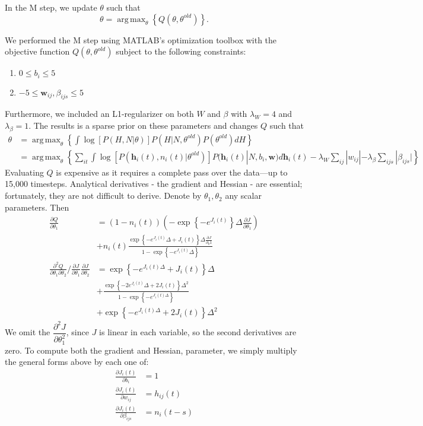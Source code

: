 \documentclass{article}
\DeclareMathOperator*{\argmax}{arg\,max}
\begin{document}
In the M step, we update $\theta$ such that 
\begin{equation}
\label{M} \theta = \argmax_{\theta} \left\{ Q(\theta,\theta^{old}) \right\}.
\end{equation}

We performed the M step using MATLAB's optimization toolbox with the
objective function $Q(\theta,\theta^{old})$ subject to the following constraints:
\begin{enumerate}
\item $0 \leq b_{i} \leq 5$
\item $-5 \leq \mathbf{w}_{ij}, \beta_{ijs} \leq 5$
\end{enumerate}

Furthermore, we included an L1-regularizer on both $W$ and $\beta$ with $\lambda_{W} = 4$ and $\lambda_{\beta} = 1$. The results is a sparse prior on these parameters and changes $Q$ such that
\begin{align*} 
 \label{Q}  
\theta &= \argmax_{\theta} \left\{ \int{ \log\left[P(H,N|\theta)\right] P(H|N,\theta^{old})P(\theta^{old}) dH }\right\}
\\                     &= \argmax_{\theta} \left\{\sum_{it} \int \log\left[P(\mathbf{h}_i(t),n_i(t)|\theta^{old})\right] P(\mathbf{h}_i(t)|N,b_i,\mathbf{w}) d\mathbf{h}_i(t) - \lambda_{W}\sum_{ij}|w_{ij}| - \lambda_{\beta}\sum_{ijs}|\beta_{ijs}|\right\}
\end{align*} 
Evaluating $Q$ is expensive as it requires a complete pass over the
data---up to 15,000 timesteps. Analytical derivatives - the gradient and Hessian - are essential;
fortunately, they are not difficult to derive. Denote by
$\theta_1, \theta_2$ any scalar parameters. Then
\begin{align*}
\frac{\partial Q}{\partial \theta_1} &= \left(1 - n_i(t)\right) \left(-\exp{\left\{-e^{J_i(t)}\right\}} \Delta \frac{\partial J}{\partial \theta_1}\right) \\
    &+ n_i(t) \frac{\exp{ \left\{ -e^{J_i(t)} \Delta + J_i(t) \right\}} \Delta \frac{\partial J}{\partial_\theta1} }{1 - \exp{\left\{-e^{J_i(t)}\Delta\right\}}} \\
\frac{\partial^2 Q}{\partial \theta_1 \partial \theta_2} / \frac{\partial J}{\partial \theta_1} \frac{\partial J}{\partial \theta_2} &= \exp{\left\{-e^{J_i(t)\Delta} + J_i(t)\right\}}\Delta \\
 &+ \frac{\exp{\left\{-2e^{J_i(t)}\Delta + 2J_i(t)\right\}}\Delta^2}{1 - \exp{\left\{-e^{J_i(t)\Delta}\right\}}} \\
 &+ \exp{\left\{-e^{J_i(t)\Delta} + 2J_i(t)\right\}} \Delta^2 
\end{align*}
We omit the $\dfrac{\partial^2 J}{\partial \theta_1^2}$, since $J$
is linear in each variable, so the second derivatives are zero. To
compute both the gradient and Hessian, parameter, we simply multiply
the general forms above by each one of:
\begin{align}
\frac{\partial J_i(t)}{\partial b_i}         &= 1 \\
\frac{\partial J_i(t)}{\partial w_{ij}}      &= h_{ij}(t) \\
\frac{\partial J_i(t)}{\partial \beta_{ijs}} &= n_i(t - s)
\end{align}
\end{document}
